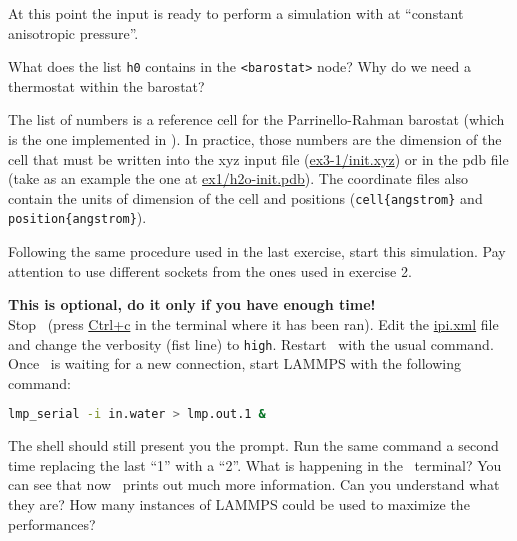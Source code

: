 \documentclass{article}
\begin{document}
\begin{Exercise}[label={inputs},title={PIMD-NPT simulation of ice}]
At this point the input is ready to perform a simulation with at
``constant anisotropic pressure''.

\Question
What does the list \texttt{h0} contains in the \texttt{<barostat>}
node? Why do we need a thermostat 
within the barostat?

The list of numbers is a reference cell for the Parrinello-Rahman
barostat (which is the one implemented in \ipi). In practice, those
numbers are the dimension of the cell that must be written into the xyz
input file (\url{ex3-1/init.xyz}) or in the pdb file (take as an
example the one at \url{ex1/h2o-init.pdb}). The coordinate files
also contain the units of dimension of the cell and positions
(\texttt{cell\{angstrom\}} and \texttt{position\{angstrom\}}).

\Question
Following the same procedure used in the last exercise, start this
simulation. Pay attention to use different sockets from the ones used
in exercise 2.

\Question
\textbf{This is optional, do it only if you have enough time!}\\
Stop \ipi\ (press \url{Ctrl+c} in the terminal where it has been
ran). Edit the \url{ipi.xml} file and change the verbosity (fist line)
to \texttt{high}. Restart \ipi\ with the usual command. Once 
\ipi\ is waiting for a new connection, start LAMMPS with
the following command:
\begin{lstlisting}[language=bash]
lmp_serial -i in.water > lmp.out.1 &
\end{lstlisting}
The shell should still present you the prompt. Run the same command a
second time replacing the last ``1'' with a ``2''. What is happening
in the \ipi\ terminal? You can see that now \ipi\ prints out much more
information. Can you understand what they are? How many instances of
LAMMPS could be used to maximize the performances?

\end{Exercise}
\end{document}
